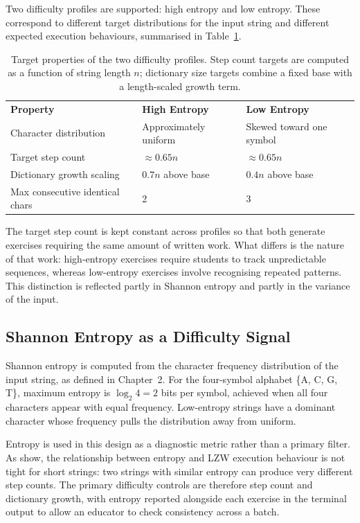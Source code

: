 \documentclass{l4proj}
\begin{document}
Two difficulty profiles are supported: high entropy and low entropy. These correspond to different target distributions for the input string and different expected execution behaviours, summarised in Table~\ref{tab:profiles}.

\begin{table}[htb]
\caption{Target properties of the two difficulty profiles. Step count targets are computed as a function of string length $n$; dictionary size targets combine a fixed base with a length-scaled growth term.}
\label{tab:profiles}
\begin{tabular}{@{}lll@{}}
\textbf{Property} & \textbf{High Entropy} & \textbf{Low Entropy} \\ Character distribution & Approximately uniform & Skewed toward one symbol \\ Target step count & $\approx 0.65n$ & $\approx 0.65n$ \\ Dictionary growth scaling & $0.7n$ above base & $0.4n$ above base \\ Max consecutive identical chars & 2 & 3 \\
\end{tabular}
\end{table}

The target step count is kept constant across profiles so that both generate exercises requiring the same amount of written work. What differs is the nature of that work: high-entropy exercises require students to track unpredictable sequences, whereas low-entropy exercises involve recognising repeated patterns. This distinction is reflected partly in Shannon entropy and partly in the variance of the input.

\subsection{Shannon Entropy as a Difficulty Signal}

Shannon entropy is computed from the character frequency distribution of the input string, as defined in Chapter~2. For the four-symbol alphabet \{A, C, G, T\}, maximum entropy is $\log_2 4 = 2$ bits per symbol, achieved when all four characters appear with equal frequency. Low-entropy strings have a dominant character whose frequency pulls the distribution away from uniform.

Entropy is used in this design as a diagnostic metric rather than a primary filter. As \citet{KosarajuManzini99} show, the relationship between entropy and LZW execution behaviour is not tight for short strings: two strings with similar entropy can produce very different step counts. The primary difficulty controls are therefore step count and dictionary growth, with entropy reported alongside each exercise in the terminal output to allow an educator to check consistency across a batch.
\end{document}
